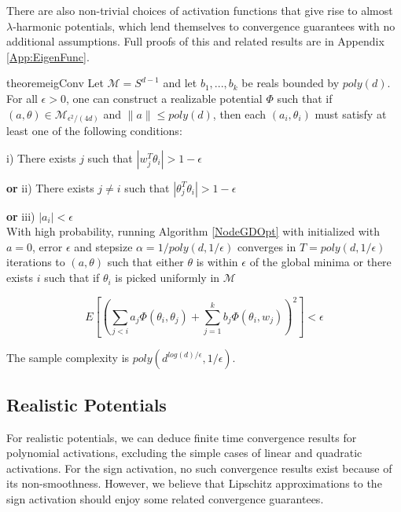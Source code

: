 \documentclass[11pt]{article}
\begin{document}
 
There are also non-trivial choices of activation functions that give rise to almost $\lambda$-harmonic potentials, which lend themselves to convergence guarantees with no additional assumptions. Full proofs of this and related results are in Appendix \ref{App:EigenFunc}.



\begin{restatable}{theorem}{eigConv}
\label{eigConv}
Let $\mathcal{M} = S^{d-1}$ and let $b_1,...,b_k$ be reals bounded by $poly(d)$. For all $ \epsilon > 0$, one can construct a realizable potential $\Phi$ such that if $(a,\theta) \in \mathcal{M}_{\epsilon^2/(4d)}$ and $\|a\| \leq poly(d)$, then each $(a_i, \theta_i)$ must satisfy at least one of the following conditions:


i) There exists $j$ such that $|w_j^T\theta_i| > 1- \epsilon$ 

{\bf or} ii) There exists $j\neq i$ such that $|\theta_j^T\theta_i| > 1- \epsilon$ 

{\bf or} iii) $|a_i| < \epsilon$\\


With high probability, running Algorithm \ref{NodeGDOpt} with initialized with $a = 0$, error $\epsilon$ and stepsize $\alpha = 1/poly(d,1/\epsilon)$ converges in $T = poly(d, 1/\epsilon)$ iterations to $(a,\theta)$ such that either  $\theta$ is within $\epsilon$ of the global minima or there exists $i$ such that if $\theta_i$ is picked uniformly in $\mathcal{M}$


\[ E\left[\left( \sum_{j < i} a_j \Phi(\theta_i,\theta_j) + \sum_{j=1}^k b_j \Phi(\theta_i,w_j)\right)^2\right] < \epsilon\]

The sample complexity is $poly(d^{log(d)/\epsilon},1/\epsilon)$.

\end{restatable}






\subsection{Realistic Potentials}

For realistic potentials, we can deduce finite time convergence results for polynomial activations, excluding the simple cases of linear and quadratic activations. For the sign activation, no such convergence results exist because of its non-smoothness. However, we believe that Lipschitz approximations to the sign activation should enjoy some related convergence guarantees.
\end{document}
